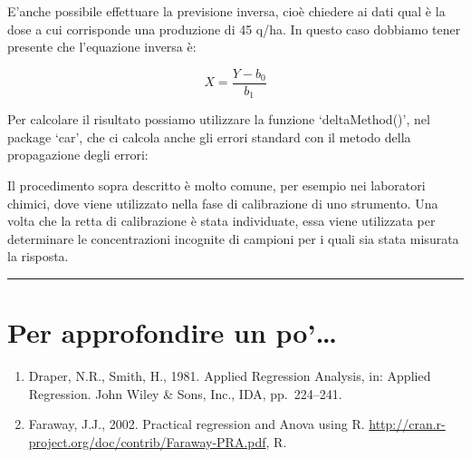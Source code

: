 \documentclass[a4paper,12pt,oneside]{book}
\providecommand{\tightlist}{%
  \setlength{\itemsep}{0pt}\setlength{\parskip}{0pt}}
\newenvironment{Shaded}{}{}
\newcommand{\KeywordTok}[1]{#1}
\newcommand{\DataTypeTok}[1]{#1}
\newcommand{\StringTok}[1]{#1}
\newcommand{\CommentTok}[1]{#1}
\newcommand{\OperatorTok}[1]{#1}
\newcommand{\NormalTok}[1]{#1}
\begin{document}
E'anche possibile effettuare la previsione inversa, cioè chiedere ai dati qual è la dose a cui corrisponde una produzione di 45 q/ha. In questo caso dobbiamo tener presente che l'equazione inversa è:

\[X = \frac{Y - b_0}{b_1}\]

Per calcolare il risultato possiamo utilizzare la funzione `deltaMethod()', nel package `car', che ci calcola anche gli errori standard con il metodo della propagazione degli errori:

\begin{Shaded}
\end{Shaded}

Il procedimento sopra descritto è molto comune, per esempio nei laboratori chimici, dove viene utilizzato nella fase di calibrazione di uno strumento. Una volta che la retta di calibrazione è stata individuate, essa viene utilizzata per determinare le concentrazioni incognite di campioni per i quali sia stata misurata la risposta.

\begin{center}\rule{0.5\linewidth}{\linethickness}\end{center}

\hypertarget{per-approfondire-un-po-8}{%
\section{Per approfondire un po'\ldots{}}\label{per-approfondire-un-po-8}}

\begin{enumerate}
\def\labelenumi{\arabic{enumi}.}
\tightlist
\item
  Draper, N.R., Smith, H., 1981. Applied Regression Analysis, in: Applied Regression. John Wiley \& Sons, Inc., IDA, pp.~224--241.
\item
  Faraway, J.J., 2002. Practical regression and Anova using R. \url{http://cran.r-project.org/doc/contrib/Faraway-PRA.pdf}, R.
\end{enumerate}
\end{document}
